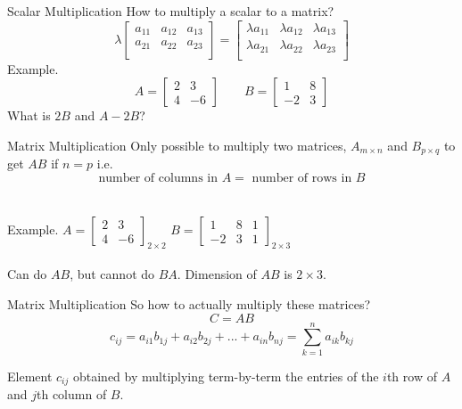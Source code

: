 \documentclass{./../../Latex/teaching_slides}
\begin{document}
\begin{frame}{Scalar Multiplication}
How to multiply a scalar to a matrix? 
$$ \lambda \begin{bmatrix} a_{11} & a_{12} & a_{13} \\ 
a_{21} & a_{22} & a_{23} \\  \end{bmatrix} = \begin{bmatrix} \lambda a_{11} & \lambda a_{12} & \lambda a_{13} \\ 
\lambda a_{21} & \lambda a_{22} & \lambda a_{23} \\  \end{bmatrix} $$
Example.
$$A = \begin{bmatrix}
2 & 3 \\
4 & -6 
\end{bmatrix}  \quad \quad
B = \begin{bmatrix}
1 & 8 \\
-2 & 3
\end{bmatrix}$$
What is $2B$ and $A-2B$?
\end{frame}


\begin{frame}{Matrix Multiplication}
Only possible to multiply two matrices, $A_{m \times n}$ and $B_{p \times q}$ to get $AB$ if $ n = p $ i.e.
$$\text{number of columns in } A = \text{ number of rows in } B $$ 
\\~\\

Example.
$A = \begin{bmatrix}
2 & 3  \\
4 & -6 
\end{bmatrix}_{2 \times 2}$ 
$B = \begin{bmatrix}
1 & 8 & 1\\
-2 & 3 & 1
\end{bmatrix}_{2 \times 3}$ \\~\\

\vspace{1em}
Can do $AB$, but cannot do $BA$. Dimension of $AB$ is $2 \times 3$.
\end{frame}




\begin{frame}{Matrix Multiplication}
So how to actually multiply these matrices? 
$$ C = AB$$
$$ c_{ij} = a_{i1} b_{1j} + a_{i2} b_{2j} + ... + a_{in} b_{nj} = \sum_{k=1}^n a_{ik} b_{kj}   $$

\vspace{1em}
Element $c_{ij}$ obtained by multiplying term-by-term the entries of the $i$th row of $A$ and $j$th column of $B$. 
\end{frame}
\end{document}
